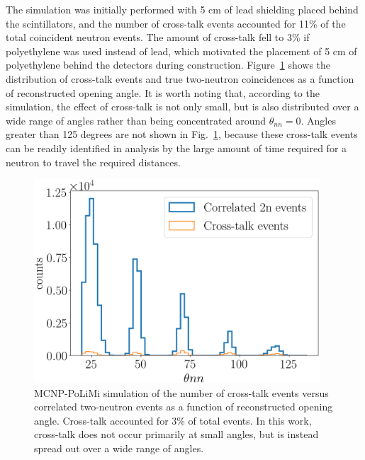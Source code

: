The simulation was initially performed with 5 cm of lead shielding placed behind the scintillators, and the number of cross-talk events accounted for 11\% of the total coincident neutron events.
The amount of cross-talk fell to 3\% if polyethylene was used instead of lead, which motivated the placement of 5 cm of polyethylene behind the detectors during construction.
Figure~\ref{fig:CrosstalkVScoincidence} shows the distribution of cross-talk events and true two-neutron coincidences as a function of reconstructed opening angle.
It is worth noting that, according to the simulation, the effect of cross-talk is not only small, but is also distributed over a wide range of angles rather than being concentrated around $\theta_{nn}=0$.
Angles greater than 125 degrees are not shown in Fig.~\ref{fig:CrosstalkVScoincidence}, because these cross-talk events can be readily identified in analysis by the large amount of time required for a neutron to travel the required distances.
\begin{figure}
    \centering
    \includegraphics[width = 0.95\textwidth]{Content/Errors/CrosstalkVScoincidence.png}
    \caption{
    MCNP-PoLiMi simulation of the number of cross-talk events versus correlated two-neutron events as a function of reconstructed opening angle.
    Cross-talk accounted for 3\% of total events.
    In this work, cross-talk does not occur primarily at small angles, but is instead spread out over a wide range of angles.
    }
    \label{fig:CrosstalkVScoincidence}
\end{figure}

